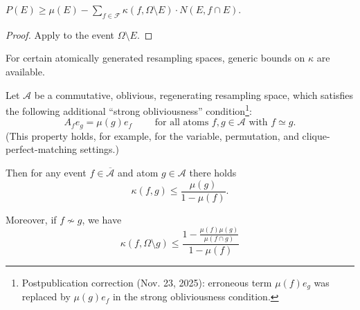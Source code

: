 \documentclass{toc}
\newcommand\oa{\overline{\mathcal A}}
\begin{document}
\begin{corollary}
\label{distthm1f}
$P(E) \geq \mu(E) -  \sum_{f \in \mathcal F} \kappa(f, \Omega \setminus E) \cdot N(E, f \cap E )$.
\end{corollary}
\begin{proof}
Apply  to the event $\Omega \setminus E$.
\end{proof}

For certain atomically generated resampling spaces, generic bounds on $\kappa$ are available.

\begin{proposition}
\label{kappabndgf2}
Let $\mathcal A$ be a commutative, oblivious, regenerating resampling space, which satisfies the following additional ``strong obliviousness''
condition\footnote{Postpublication correction (Nov. 23, 2025): erroneous term
$\mu(f) e_g$ was replaced by $\mu(g)e_f$ in the strong obliviousness condition.}:
$$
%
A_f e_g = \mu(g) e_f \qquad \text{ for all atoms $f,g \in \mathcal A$ with $f \simeq g$.}
$$
(This property  holds, for example, for the variable, permutation, and clique-perfect-matching settings.)

\medskip

Then for any  event $f \in \oa$ and atom $g \in \mathcal A$ there holds
$$
\kappa(f,g) \leq \frac{\mu(g)}{1 -  \mu(f)}.
$$

 Moreover, if $f \not \sim g$, we have
$$
\kappa(f,\Omega \setminus g) \leq \frac{1 - \frac{\mu(f) \mu(g)}{\mu(f \cap g)}}{1 -  \mu(f)}
$$ 
\end{proposition}
\end{document}
